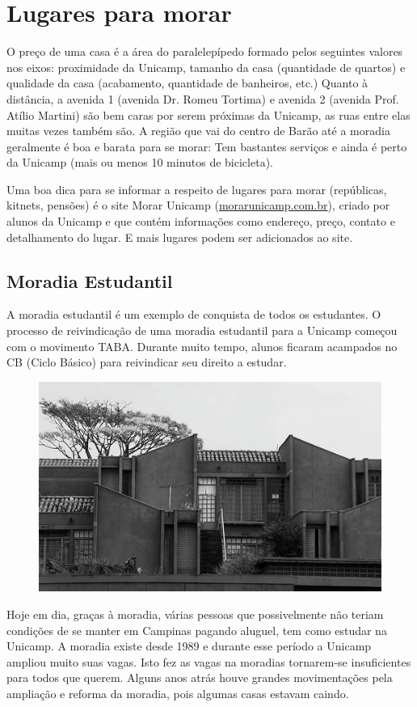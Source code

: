 
\section{Lugares para morar}

O preço de uma casa é a área do paralelepípedo formado pelos seguintes valores
nos eixos: proximidade da Unicamp, tamanho da casa (quantidade de quartos)
e qualidade da casa (acabamento, quantidade de banheiros, etc.) Quanto
à distância, a avenida 1 (avenida Dr. Romeu Tortima) e avenida 2 (avenida Prof.
Atílio Martini) são bem caras por serem próximas da Unicamp, as ruas entre elas
muitas vezes também são. A região que vai do centro de Barão até a moradia
geralmente é boa e barata para se morar: Tem bastantes serviços e ainda é perto
da Unicamp (mais ou menos 10 minutos de bicicleta).

Uma boa dica para se informar a respeito de lugares para morar (repúblicas,
kitnets, pensões) é o site Morar Unicamp
(\url{morarunicamp.com.br}), criado por alunos da Unicamp e que
contém informações como endereço, preço, contato e detalhamento do lugar. E mais
lugares podem ser adicionados ao site.

\subsection{Moradia Estudantil}

A moradia estudantil é um exemplo de conquista de todos os estudantes.
O processo de reivindicação de uma moradia estudantil para a Unicamp começou com
o movimento TABA. Durante muito tempo, alunos ficaram acampados no CB (Ciclo
Básico) para reivindicar seu direito a estudar.
\begin{figure}[h!]
    \centering
    \includegraphics[scale=0.55,keepaspectratio=true]{img/imgs/5-moradia/-029.jpg}
\end{figure}
Hoje em dia, graças à moradia,
várias pessoas que possivelmente não teriam condições de se manter em Campinas
pagando aluguel, tem como estudar na Unicamp. A moradia existe desde 1989
e durante esse período a Unicamp ampliou muito suas vagas. Isto fez as vagas na
moradias tornarem-se insuficientes para todos que querem. Alguns anos atrás
houve grandes movimentações pela ampliação e reforma da moradia, pois algumas
casas estavam caindo.

